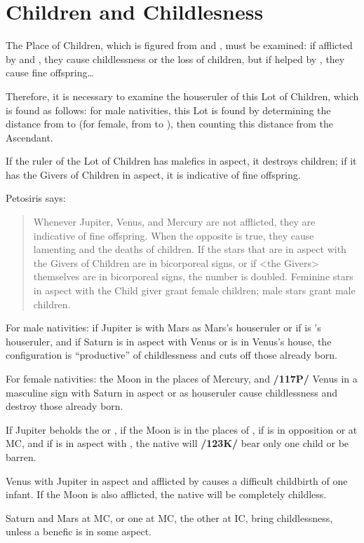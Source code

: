 \section{Children and Childlesness}
The Place of Children, which is figured from \Mercury\xspace and \Venus, must be examined: if afflicted by \Saturn\xspace and \Mars, they cause childlessness or the loss of children, but if helped by \Jupiter, they cause fine offspring\ldots

Therefore, it is necessary to examine the houseruler of this Lot of Children, which is found as follows: for male nativities, this Lot is found by determining the distance from \Jupiter\xspace to \Mercury\xspace (for female, from \Jupiter\xspace to \Venus), then counting this distance from the Ascendant. 

If the ruler of the Lot of Children has malefics in aspect, it destroys children; if it has the Givers of Children in aspect, it is indicative of fine offspring.

Petosiris says:\begin{quote}Whenever Jupiter, Venus, and Mercury are not afflicted, they are indicative of fine offspring. When the opposite is true, they cause lamenting and the deaths of children. If the stars that are in aspect with the Givers of Children are in bicorporeal signs, or if <the Givers> themselves are in bicorporeal signs, the number is doubled. Feminine stars in aspect with the Child giver grant female children; male stars grant male children.\end{quote}

For male nativities: if Jupiter is with Mars as Mars’s houseruler or if \Mars\xspace is \Jupiter’s houseruler, and if Saturn is in aspect with Venus or is in Venus's house, the configuration is “productive” of childlessness and cuts off those already born.

For female nativities: the Moon in the places of Mercury, and \textbf{/117P/} Venus in a masculine sign with Saturn in aspect or as houseruler cause childlessness and destroy those already born. 

If Jupiter beholds the \Moon\xspace or \Venus, if the Moon is in the places of \Mercury, if \Saturn\xspace is in opposition or at MC, and if \Mars\xspace is in aspect with \Saturn, the native will \textbf{/123K/} bear only one child or be barren. 

Venus with Jupiter in aspect and afflicted by \Saturn\xspace causes a difficult childbirth of one infant. If the Moon is also afflicted, the native will be completely childless. 

Saturn and Mars at MC, or one at MC, the other at IC, bring childlessness, unless a benefic is in some aspect.

\newpage
